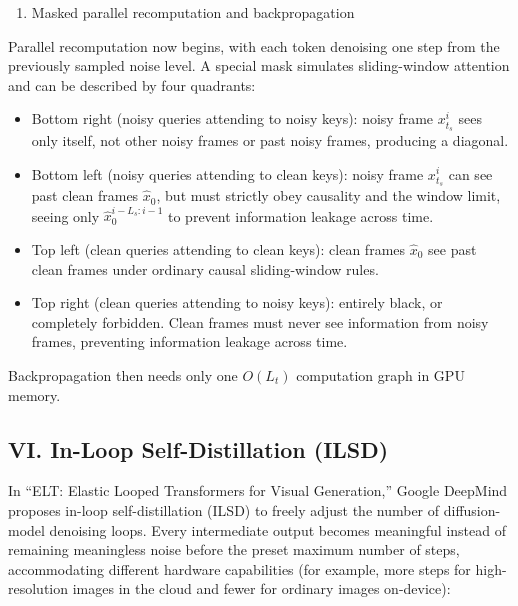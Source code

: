 \begin{enumerate}
\def\labelenumi{\arabic{enumi}.}
\setcounter{enumi}{2}
\tightlist
\item
  Masked parallel recomputation and backpropagation
\end{enumerate}

Parallel recomputation now begins, with each token denoising one step from the previously sampled noise level. A special mask simulates sliding-window attention and can be described by four quadrants:

\begin{itemize}
\tightlist
\item
  Bottom right (noisy queries attending to noisy keys): noisy frame \(x_{t_s}^i\) sees only itself, not other noisy frames or past noisy frames, producing a diagonal.
\item
  Bottom left (noisy queries attending to clean keys): noisy frame \(x_{t_s}^i\) can see past clean frames \(\hat{x}_0\), but must strictly obey causality and the window limit, seeing only \(\hat{x}_0^{i-L_s:i-1}\) to prevent information leakage across time.
\item
  Top left (clean queries attending to clean keys): clean frames \(\hat{x}_0\) see past clean frames under ordinary causal sliding-window rules.
\item
  Top right (clean queries attending to noisy keys): entirely black, or completely forbidden. Clean frames must never see information from noisy frames, preventing information leakage across time.
\end{itemize}

Backpropagation then needs only one \(O(L_t)\) computation graph in GPU memory.

\hypertarget{vi.-in-loop-self-distillation-ilsd}{%
\subsection{VI. In-Loop Self-Distillation (ILSD)}\label{vi.-in-loop-self-distillation-ilsd}}

In ``ELT: Elastic Looped Transformers for Visual Generation,'' Google DeepMind proposes in-loop self-distillation (ILSD) to freely adjust the number of diffusion-model denoising loops. Every intermediate output becomes meaningful instead of remaining meaningless noise before the preset maximum number of steps, accommodating different hardware capabilities (for example, more steps for high-resolution images in the cloud and fewer for ordinary images on-device):

